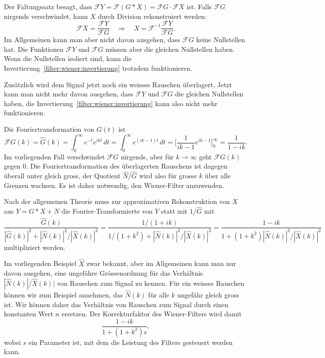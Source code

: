 Der Faltungssatz besagt, dass
$\mathcal{F}Y= \mathcal{F} (G*X) = \mathcal{F}G \cdot \mathcal{F}X$
ist.
Falls $\mathcal{F}G$ nirgends verschwindet, kann $X$ durch Division 
rekonstruiert werden:
\begin{equation}
\mathcal{F}X
=
\frac{\mathcal{F}Y}{\mathcal{F}G}
\quad\Rightarrow\quad
X=\mathcal{F}^{-1}
\frac{\mathcal{F}Y}{\mathcal{F}G}.
\label{filter:wiener:invertierung}
\end{equation}
Im Allgemeinen kann man aber nicht davon ausgehen, dass $\mathcal{F}G$
keine Nullstellen hat.
Die Funktionen $\mathcal{F}Y$ und $\mathcal{F}G$ müssen aber die gleichen 
Nullstellen haben.
Wenn die Nullstellen isoliert sind, kann die
Invertierung~\eqref{filter:wiener:invertierung} trotzdem funktionieren.

Zusätzlich wird dem Signal jetzt noch ein weisses Rauschen überlagert.
Jetzt kann man nicht mehr davon ausgehen, dass $\mathcal{F}Y$ und 
$\mathcal{F}G$ die gleichen Nullstellen haben, die 
Invertierung~\eqref{filter:wiener:invertierung} kann also nicht
mehr funktionieren.

Die Fouriertransformation von $G(t)$ ist
\begin{equation}
\mathcal{F}G(k)
=
\hat{G}(k)
=
\int_0^\infty e^{-t} e^{ikt}\,dt
=
\int_0^\infty e^{(ik-1)t}\,dt
=
\biggl[\frac{1}{ik-1}e^{ik-1}\biggr]_0^\infty
=
\frac{1}{1-ik}.
\end{equation}
Im vorliegenden Fall verschwindet $\mathcal{F}G$ nirgends, aber
für $k\to\infty$ geht $\mathcal{F}G(k)$ gegen $0$.
Die Fouriertransformation des überlagerten Rauschens ist dagegen überall
unter gleich gross, der Quotient $\hat{N}/\hat{G}$ wird also für
grosse $k$ über alle Grenzen wachsen.
Es ist daher notwendig, den Wiener-Filter anzuwenden.

Nach der allgemeinen Theorie muss zur approximativen Rekonstruktion
von $X$ aus $Y=G*X+N$ die Fourier-Transformierte von $Y$ statt mit
$1/\hat{G}$ mit
\[
\frac{\overline{\hat{G}(k)}}{
|\hat{G}(k)|^2
+
|\hat{N}(k)|^2/|\hat{X}(k)|^2
}
=
\frac{1/(1+ik)}{
1/(1+k^2)
+
|\hat{N}(k)|^2/|\hat{X}(k)|^2
}
=
\frac{1-ik}{1+(1+k^2) |\hat{N}(k)|^2/|\hat{X}(k)|^2}
\]
multipliziert werden.

Im vorliegenden Beispiel $\hat{X}$ zwar bekannt, aber im Allgemeinen
kann man nur davon ausgehen, eine ungefähre Grössenordnung für das
Verhältnis $|\hat{N}(k)|/\hat{X}(k)|$ von Rauschen zum Signal
zu kennen.
Für ein weisses Rauschen können wir zum Beispiel annehmen, das $\hat{N}(k)$
für alle $k$ ungefähr gleich gross ist.
Wir können daher das Verhältnis von Rauschen zum Signal durch einen
konstanten Wert $n$ ersetzen.
Der Korrekturfaktor des Wiener-Filters wird damit
\[
\frac{1-ik}{1+(1+k^2) s},
\]
wobei $s$ ein Parameter ist, mit dem die Leistung des Filters gesteuert
werden kann.

